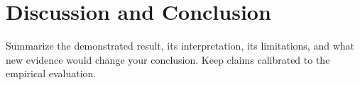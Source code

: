 \section{Discussion and Conclusion}
Summarize the demonstrated result, its interpretation, its limitations, and
what new evidence would change your conclusion. Keep claims calibrated to the
empirical evaluation.
